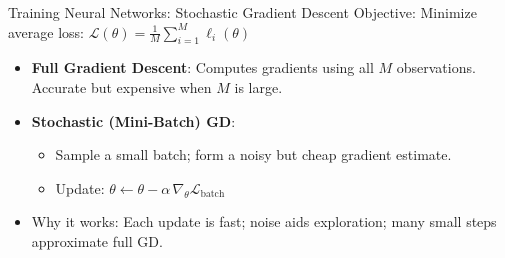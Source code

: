 \documentclass[aspectratio=169]{beamer}
\newcommand{\1}{\mathbf{1}}
\begin{document}
\begin{frame}{Training Neural Networks: Stochastic Gradient Descent}
    \small
    Objective: Minimize average loss: $\mathcal{L}(\theta) = \frac{1}{M} \sum_{i=1}^M \ell_i(\theta)$
    
    \vspace{0.3em}
    \begin{itemize}
        \setlength\itemsep{0.3em}
        \item \textbf{Full Gradient Descent}: Computes gradients using all $M$ observations. Accurate but expensive when $M$ is large.
    
        \item \textbf{Stochastic (Mini-Batch) GD}:
        \begin{itemize}
            \item Sample a small batch; form a noisy but cheap gradient estimate.
            \item Update: $\theta \leftarrow \theta - \alpha \, \nabla_\theta \mathcal{L}_{\text{batch}}$
        \end{itemize}
    
        \item Why it works: Each update is fast; noise aids exploration; many small steps approximate full GD.
    \end{itemize}
\end{frame}
\end{document}
